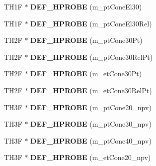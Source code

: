 \begin{DoxyCompactItemize}
\item 
\hypertarget{classHistos__Fake_a03b5d07e31f696125e0231157ba2edc7}{
TH1F $\ast$ {\bfseries DEF\_\-HPROBE} (m\_\-ptConeEl30)}
\label{classHistos__Fake_a03b5d07e31f696125e0231157ba2edc7}

\item 
\hypertarget{classHistos__Fake_ad543c97c21fe7d709e1b3e3a837ecf30}{
TH1F $\ast$ {\bfseries DEF\_\-HPROBE} (m\_\-ptConeEl30Rel)}
\label{classHistos__Fake_ad543c97c21fe7d709e1b3e3a837ecf30}

\item 
\hypertarget{classHistos__Fake_ae58835b41d5043e46a80161b81e2db2a}{
TH2F $\ast$ {\bfseries DEF\_\-HPROBE} (m\_\-ptCone30Pt)}
\label{classHistos__Fake_ae58835b41d5043e46a80161b81e2db2a}

\item 
\hypertarget{classHistos__Fake_ad3b81ee5b7562ef6610aa7d2780e86c6}{
TH2F $\ast$ {\bfseries DEF\_\-HPROBE} (m\_\-ptCone30RelPt)}
\label{classHistos__Fake_ad3b81ee5b7562ef6610aa7d2780e86c6}

\item 
\hypertarget{classHistos__Fake_af0b91b47c50b4c68325d6a9412957133}{
TH2F $\ast$ {\bfseries DEF\_\-HPROBE} (m\_\-etCone30Pt)}
\label{classHistos__Fake_af0b91b47c50b4c68325d6a9412957133}

\item 
\hypertarget{classHistos__Fake_aebec699361ffbb3811f61e86e8bb1e27}{
TH2F $\ast$ {\bfseries DEF\_\-HPROBE} (m\_\-etCone30RelPt)}
\label{classHistos__Fake_aebec699361ffbb3811f61e86e8bb1e27}

\item 
\hypertarget{classHistos__Fake_a7031fd72bc6fb4d1efbcb48a786d2901}{
TH3F $\ast$ {\bfseries DEF\_\-HPROBE} (m\_\-ptCone20\_\-npv)}
\label{classHistos__Fake_a7031fd72bc6fb4d1efbcb48a786d2901}

\item 
\hypertarget{classHistos__Fake_a6f1b9e27b944842f7efc9526d4cfebe8}{
TH3F $\ast$ {\bfseries DEF\_\-HPROBE} (m\_\-ptCone30\_\-npv)}
\label{classHistos__Fake_a6f1b9e27b944842f7efc9526d4cfebe8}

\item 
\hypertarget{classHistos__Fake_a65d1f10ce7b23712ea1362ebafb71d93}{
TH3F $\ast$ {\bfseries DEF\_\-HPROBE} (m\_\-ptCone40\_\-npv)}
\label{classHistos__Fake_a65d1f10ce7b23712ea1362ebafb71d93}

\item 
\hypertarget{classHistos__Fake_a043aacded1d2772c6c49a16c254b76e6}{
TH3F $\ast$ {\bfseries DEF\_\-HPROBE} (m\_\-etCone20\_\-npv)}
\label{classHistos__Fake_a043aacded1d2772c6c49a16c254b76e6}


\end{DoxyCompactItemize}
